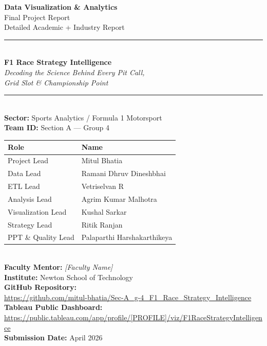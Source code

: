 \documentclass[12pt, a4paper]{article}
\begin{document}
\thispagestyle{empty}
\begin{center}

\vspace*{1cm}

{\Huge\bfseries\textcolor{darknavy}{Data Visualization \& Analytics}}\\[0.3cm]
{\Large\textcolor{sectiongray}{Final Project Report}}\\[0.2cm]
{\large Detailed Academic + Industry Report}\\[1.5cm]

\rule{0.6\textwidth}{1.5pt}\\[1cm]

{\LARGE\bfseries\textcolor{f1red}{F1 Race Strategy Intelligence}}\\[0.4cm]
{\large\textit{Decoding the Science Behind Every Pit Call,\\Grid Slot \& Championship Point}}\\[1.5cm]

\rule{0.6\textwidth}{1.5pt}\\[1cm]

\textbf{Sector:} Sports Analytics / Formula 1 Motorsport\\[0.5cm]

\textbf{Team ID:} Section A — Group 4\\[0.3cm]

\begin{tabular}{l l}
\toprule
\textbf{Role} & \textbf{Name} \\
\midrule
Project Lead         & Mitul Bhatia \\
Data Lead            & Ramani Dhruv Dineshbhai \\
ETL Lead             & Vetriselvan R \\
Analysis Lead        & Agrim Kumar Malhotra \\
Visualization Lead   & Kushal Sarkar \\
Strategy Lead        & Ritik Ranjan \\
PPT \& Quality Lead  & Palaparthi Harshakarthikeya \\
\bottomrule
\end{tabular}\\[1cm]

\textbf{Faculty Mentor:} \textit{[Faculty Name]}\\[0.3cm]
\textbf{Institute:} Newton School of Technology\\[0.5cm]

\textbf{GitHub Repository:}\\
\url{https://github.com/mitul-bhatia/Sec-A_g-4_F1_Race_Strategy_Intelligence}\\[0.3cm]

\textbf{Tableau Public Dashboard:}\\
\url{https://public.tableau.com/app/profile/[PROFILE]/viz/F1RaceStrategyIntelligence}\\[0.3cm]

\textbf{Submission Date:} April 2026

\end{center}
\newpage
\end{document}

